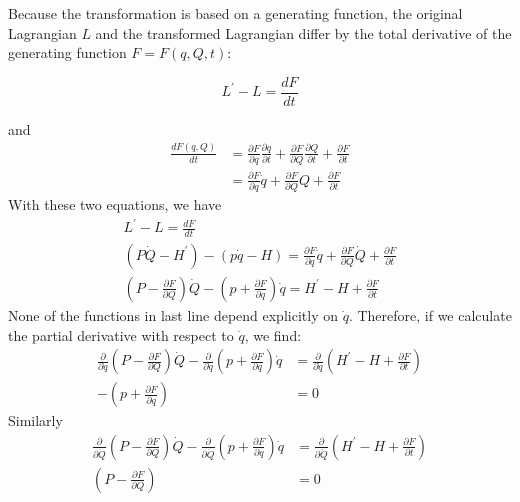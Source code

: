 Because the transformation is based on a generating function, the original Lagrangian $L$ and the transformed Lagrangian differ by the total derivative of the generating function $F=F(q,Q,t)$:
\begin{qt}
    \begin{equation}
        L^{\prime}-L=\frac{d F}{d t}
    \end{equation}
\end{qt}
and
$$
\begin{aligned}
\frac{d F(q, Q)}{d t} &=\frac{\partial F}{\partial q} \frac{\partial q}{\partial t}+\frac{\partial F}{\partial Q} \frac{\partial Q}{\partial t}+\frac{\partial F}{\partial t} \\
&=\frac{\partial F}{\partial q} \dot{q}+\frac{\partial F}{\partial Q} Q+\frac{\partial F}{\partial t}
\end{aligned}
$$
With these two equations, we have
$$
\begin{array}{c}
{L^{\prime}-L=\frac{d F}{d t}} \\
{\left(P \dot{Q}-H^{\prime}\right)-(p \dot{q}-H)=\frac{\partial F}{\partial q} \dot{q}+\frac{\partial F}{\partial Q} \dot{Q}+\frac{\partial F}{\partial t}} \\
{\left(P-\frac{\partial F}{\partial Q}\right) \dot{Q}-\left(p+\frac{\partial F}{\partial q}\right) \dot{q}=H^{\prime}-H+\frac{\partial F}{\partial t}}
\end{array}
$$
None of the functions in last line depend explicitly on $\dot{q}$. Therefore, if we calculate the partial derivative with respect to $\dot{q}$, we find:
\begin{equation}
\begin{aligned}
\frac{\partial}{\partial \dot{q}}\left(P-\frac{\partial F}{\partial Q}\right) \dot{Q}-\frac{\partial}{\partial \dot{q}}\left(p+\frac{\partial F}{\partial q}\right) \dot{q} &=\frac{\partial}{\partial \dot{q}}\left(H^{\prime}-H+\frac{\partial F}{\partial t}\right) \\
-\left(p+\frac{\partial F}{\partial q}\right) &=0
\end{aligned}
\end{equation}
Similarly
\begin{equation}
\begin{aligned}
\frac{\partial}{\partial \dot{Q}}\left(P-\frac{\partial F}{\partial Q}\right) \dot{Q}-\frac{\partial}{\partial \dot{Q}}\left(p+\frac{\partial F}{\partial q}\right) \dot{q} &=\frac{\partial}{\partial \dot{Q}}\left(H^{\prime}-H+\frac{\partial F}{\partial t}\right) \\
\left(P-\frac{\partial F}{\partial Q}\right) &=0
\end{aligned}
\end{equation}

